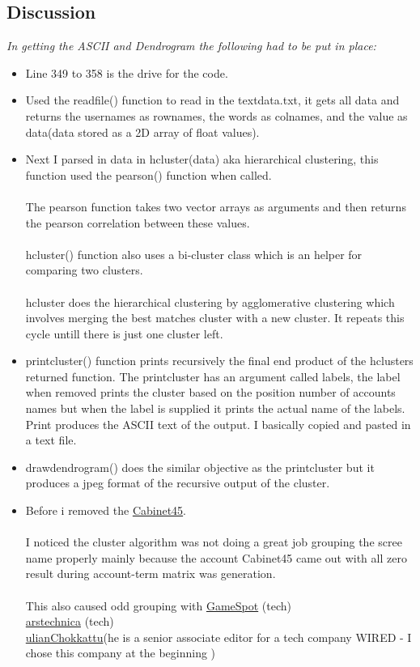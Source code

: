 \documentclass[12pt]{article}
\begin{document}
\subsection*{Discussion}
\emph{In getting the ASCII and Dendrogram the following had to be put in place:}
    \begin{itemize}
        \item Line 349 to 358 is the drive for the code.
        
        \item Used the readfile() function to read in the textdata.txt,  it gets all data and returns the usernames as rownames, the words as colnames, and the value as data(data stored as a 2D array of float values).
        \item Next I parsed in data in  hcluster(data) aka hierarchical clustering, this function used the pearson() function when called.
        \\ \\The pearson function takes two vector arrays as arguments and then returns the pearson correlation between these values.\\ \\hcluster() function also uses a bi-cluster class which is an helper for comparing two clusters. \\ \\hcluster does the hierarchical clustering by agglomerative clustering which involves merging the  best  matches cluster with a  new cluster. It repeats this cycle untill there is just one cluster left.
        \item printcluster() function prints recursively the final end product of the hclusters returned function. The printcluster has an argument called labels, the label when removed prints the cluster based on the position number of accounts names but when the label is supplied it prints the actual name of the labels. Print produces the ASCII text of the output. I basically copied and pasted in  a text file.
        \item drawdendrogram() does the similar objective as the printcluster but it produces a jpeg format of the recursive output of the cluster.
        \item Before i removed the \href{https://twitter.com/Cabinet45}{Cabinet45}.\\ \\ I noticed the cluster algorithm was not doing a great job grouping the scree name properly mainly because the account Cabinet45 came out with all zero result during account-term matrix was generation.\\ \\This also caused odd grouping with \href{https://twitter.com/GameSpot?s=20}{GameSpot} (tech)\\ \href{https://twitter.com/arstechnica?s=20}{arstechnica} (tech)\\ \href{https://twitter.com/JulianChokkattu?s=20}{ulianChokkattu}(he is a senior associate editor for a tech company WIRED - I chose this company at the beginning )

\end{itemize}
\end{document}
